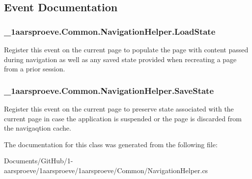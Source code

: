 \subsection{Event Documentation}
\hypertarget{class__1aarsproeve_1_1_common_1_1_navigation_helper_ab4abff9d3eb04794d05d43ff3846e344}{}
\subsubsection[{Load\+State}]{ \+\_\+1aarsproeve.\+Common.\+Navigation\+Helper.\+Load\+State}\label{class__1aarsproeve_1_1_common_1_1_navigation_helper_ab4abff9d3eb04794d05d43ff3846e344}


Register this event on the current page to populate the page with content passed during navigation as well as any saved state provided when recreating a page from a prior session. 

\hypertarget{class__1aarsproeve_1_1_common_1_1_navigation_helper_a627a89278c28e536b6e7fea11da6d465}{}
\subsubsection[{Save\+State}]{ \+\_\+1aarsproeve.\+Common.\+Navigation\+Helper.\+Save\+State}\label{class__1aarsproeve_1_1_common_1_1_navigation_helper_a627a89278c28e536b6e7fea11da6d465}


Register this event on the current page to preserve state associated with the current page in case the application is suspended or the page is discarded from the navigaqtion cache. 



The documentation for this class was generated from the following file\+:\begin{DoxyCompactItemize}
\item 
Documents/\+Git\+Hub/1-\/aarsproeve/1aarsproeve/1aarsproeve/\+Common/Navigation\+Helper.\+cs\end{DoxyCompactItemize}
